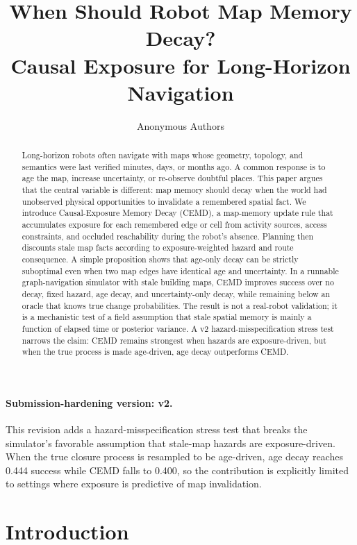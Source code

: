 \documentclass{article}
\title{When Should Robot Map Memory Decay?\\Causal Exposure for Long-Horizon Navigation}
\author{Anonymous Authors}
\begin{document}
\maketitle

\paragraph{Submission-hardening version: v2.}
This revision adds a hazard-misspecification stress test that breaks the simulator's favorable assumption that stale-map hazards are exposure-driven. When the true closure process is resampled to be age-driven, age decay reaches 0.444 success while CEMD falls to 0.400, so the contribution is explicitly limited to settings where exposure is predictive of map invalidation.

\begin{abstract}
Long-horizon robots often navigate with maps whose geometry, topology, and semantics were last verified minutes, days, or months ago. A common response is to age the map, increase uncertainty, or re-observe doubtful places. This paper argues that the central variable is different: map memory should decay when the world had unobserved physical opportunities to invalidate a remembered spatial fact. We introduce Causal-Exposure Memory Decay (CEMD), a map-memory update rule that accumulates exposure for each remembered edge or cell from activity sources, access constraints, and occluded reachability during the robot's absence. Planning then discounts stale map facts according to exposure-weighted hazard and route consequence. A simple proposition shows that age-only decay can be strictly suboptimal even when two map edges have identical age and uncertainty. In a runnable graph-navigation simulator with stale building maps, CEMD improves success over no decay, fixed hazard, age decay, and uncertainty-only decay, while remaining below an oracle that knows true change probabilities. The result is not a real-robot validation; it is a mechanistic test of a field assumption that stale spatial memory is mainly a function of elapsed time or posterior variance.
A v2 hazard-misspecification stress test narrows the claim: CEMD remains strongest when hazards are exposure-driven, but when the true process is made age-driven, age decay outperforms CEMD.
\end{abstract}

\section{Introduction}
\end{document}
